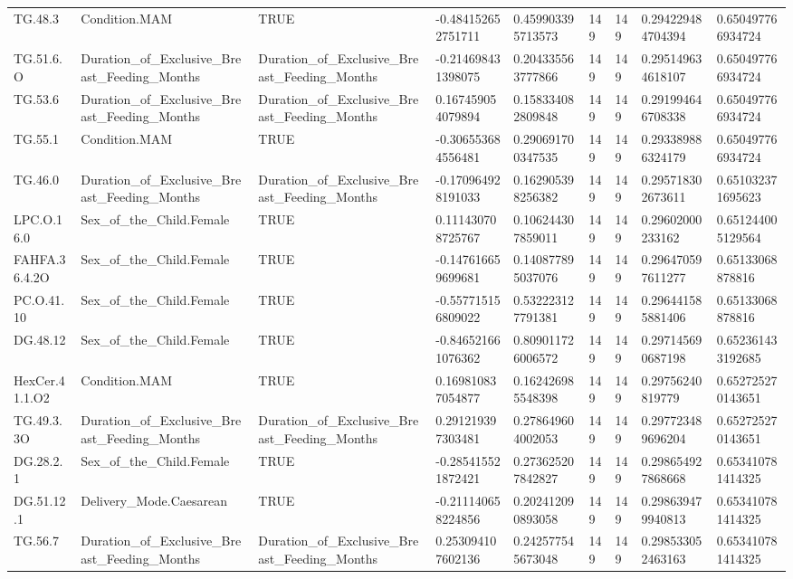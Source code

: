 \begin{longtable}{lllllllll}
TG.48.3 & Condition.MAM & TRUE & -0.484152652751711 & 0.459903395713573 & 149 & 149 & 0.294229484704394 & 0.650497766934724 \\
TG.51.6.O & Duration\_of\_Exclusive\_Breast\_Feeding\_Months & Duration\_of\_Exclusive\_Breast\_Feeding\_Months & -0.214698431398075 & 0.204335563777866 & 149 & 149 & 0.295149634618107 & 0.650497766934724 \\
TG.53.6 & Duration\_of\_Exclusive\_Breast\_Feeding\_Months & Duration\_of\_Exclusive\_Breast\_Feeding\_Months & 0.167459054079894 & 0.158334082809848 & 149 & 149 & 0.291994646708338 & 0.650497766934724 \\
TG.55.1 & Condition.MAM & TRUE & -0.306553684556481 & 0.290691700347535 & 149 & 149 & 0.293389886324179 & 0.650497766934724 \\
TG.46.0 & Duration\_of\_Exclusive\_Breast\_Feeding\_Months & Duration\_of\_Exclusive\_Breast\_Feeding\_Months & -0.170964928191033 & 0.162905398256382 & 149 & 149 & 0.295718302673611 & 0.651032371695623 \\
LPC.O.16.0 & Sex\_of\_the\_Child.Female & TRUE & 0.111430708725767 & 0.106244307859011 & 149 & 149 & 0.29602000233162 & 0.651244005129564 \\
FAHFA.36.4.2O & Sex\_of\_the\_Child.Female & TRUE & -0.147616659699681 & 0.140877895037076 & 149 & 149 & 0.296470597611277 & 0.65133068878816 \\
PC.O.41.10 & Sex\_of\_the\_Child.Female & TRUE & -0.557715156809022 & 0.532223127791381 & 149 & 149 & 0.296441585881406 & 0.65133068878816 \\
DG.48.12 & Sex\_of\_the\_Child.Female & TRUE & -0.846521661076362 & 0.809011726006572 & 149 & 149 & 0.297145690687198 & 0.652361433192685 \\
HexCer.41.1.O2 & Condition.MAM & TRUE & 0.169810837054877 & 0.162426985548398 & 149 & 149 & 0.29756240819779 & 0.652725270143651 \\
TG.49.3.3O & Duration\_of\_Exclusive\_Breast\_Feeding\_Months & Duration\_of\_Exclusive\_Breast\_Feeding\_Months & 0.291219397303481 & 0.278649604002053 & 149 & 149 & 0.297723489696204 & 0.652725270143651 \\
DG.28.2.1 & Sex\_of\_the\_Child.Female & TRUE & -0.285415521872421 & 0.273625207842827 & 149 & 149 & 0.298654927868668 & 0.653410781414325 \\
DG.51.12.1 & Delivery\_Mode.Caesarean & TRUE & -0.211140658224856 & 0.202412090893058 & 149 & 149 & 0.298639479940813 & 0.653410781414325 \\
TG.56.7 & Duration\_of\_Exclusive\_Breast\_Feeding\_Months & Duration\_of\_Exclusive\_Breast\_Feeding\_Months & 0.253094107602136 & 0.242577545673048 & 149 & 149 & 0.298533052463163 & 0.653410781414325 \\

\end{longtable}
